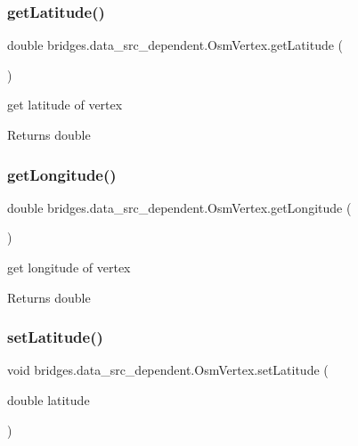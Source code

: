 \subsubsection{\texorpdfstring{get\+Latitude()}{getLatitude()}}
{\footnotesize\ttfamily double bridges.\+data\+\_\+src\+\_\+dependent.\+Osm\+Vertex.\+get\+Latitude (\begin{DoxyParamCaption}{ }\end{DoxyParamCaption})}

get latitude of vertex \begin{DoxyReturn}{Returns}
double 
\end{DoxyReturn}
\mbox{\label{classbridges_1_1data__src__dependent_1_1_osm_vertex_a73ce32c2897be14aa893822ce4081f3d}} 
\subsubsection{\texorpdfstring{get\+Longitude()}{getLongitude()}}
{\footnotesize\ttfamily double bridges.\+data\+\_\+src\+\_\+dependent.\+Osm\+Vertex.\+get\+Longitude (\begin{DoxyParamCaption}{ }\end{DoxyParamCaption})}

get longitude of vertex \begin{DoxyReturn}{Returns}
double 
\end{DoxyReturn}
\mbox{\label{classbridges_1_1data__src__dependent_1_1_osm_vertex_afda8504609680c855ea81f0c679298e9}} 
\subsubsection{\texorpdfstring{set\+Latitude()}{setLatitude()}}
{\footnotesize\ttfamily void bridges.\+data\+\_\+src\+\_\+dependent.\+Osm\+Vertex.\+set\+Latitude (\begin{DoxyParamCaption}\item[{double}]{latitude }\end{DoxyParamCaption})}

